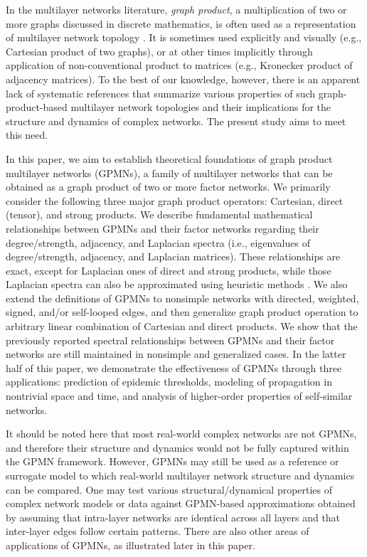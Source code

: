 \documentclass{article}
\begin{document}
In the multilayer networks literature, {\em graph product}, a
multiplication of two or more graphs discussed in discrete
mathematics, is often used as a representation of multilayer network
topology
\cite{leskovec2010kronecker,sole2013spectral,de2013mathematical,asllani2015turing,brechtel2016master}. It
is sometimes used explicitly and visually (e.g., Cartesian product of
two graphs), or at other times implicitly through application of
non-conventional product to matrices (e.g., Kronecker product of
adjacency matrices). To the best of our knowledge, however, there is
an apparent lack of systematic references that summarize various
properties of such graph-product-based multilayer network topologies
and their implications for the structure and dynamics of complex
networks. The present study aims to meet this need.

In this paper, we aim to establish theoretical foundations of graph
product multilayer networks (GPMNs), a family of multilayer networks
that can be obtained as a graph product of two or more factor
networks. We primarily consider the following three major graph
product operators: Cartesian, direct (tensor), and strong products. We
describe fundamental mathematical relationships between GPMNs and
their factor networks regarding their degree/strength, adjacency, and
Laplacian spectra (i.e., eigenvalues of degree/strength, adjacency,
and Laplacian matrices). These relationships are exact, except for
Laplacian ones of direct and strong products, while those Laplacian
spectra can also be approximated using heuristic methods
\cite{sayama2016estimation}. We also extend the definitions of GPMNs
to nonsimple networks with directed, weighted, signed, and/or
self-looped edges, and then generalize graph product operation to
arbitrary linear combination of Cartesian and direct products. We show
that the previously reported spectral relationships between GPMNs and
their factor networks are still maintained in nonsimple and
generalized cases. In the latter half of this paper, we demonstrate
the effectiveness of GPMNs through three applications: prediction of
epidemic thresholds, modeling of propagation in nontrivial space and
time, and analysis of higher-order properties of self-similar
networks.

It should be noted here that most real-world complex networks are not
GPMNs, and therefore their structure and dynamics would not be
fully captured within the GPMN framework. However, GPMNs may still be
used as a reference or surrogate model to which real-world multilayer
network structure and dynamics can be compared. One may test various
structural/dynamical properties of complex network models or data
against GPMN-based approximations obtained by assuming that
intra-layer networks are identical across all layers and that
inter-layer edges follow certain patterns. There are also other areas
of applications of GPMNs, as illustrated later in this paper.
\end{document}
